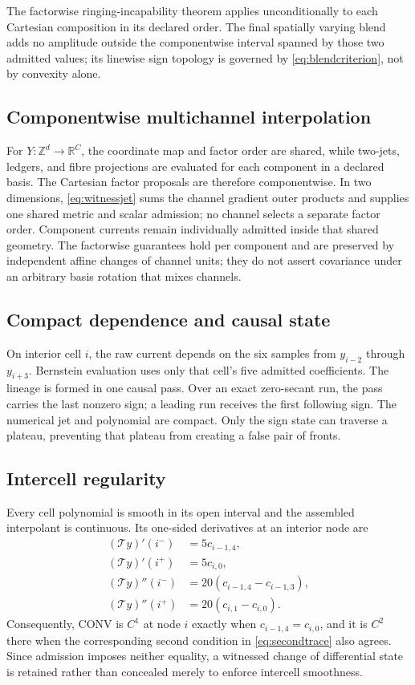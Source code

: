 \documentclass[journal]{IEEEtran}
\newcommand{\R}{\mathbb{R}}
\newcommand{\Tcal}{\mathcal{T}}
\begin{document}
The factorwise ringing-incapability theorem applies unconditionally to each
Cartesian composition in its declared order. The final spatially varying
blend adds no amplitude outside the componentwise interval spanned by those
two admitted values; its linewise sign topology is governed by
\eqref{eq:blendcriterion}, not by convexity alone.

\subsection{Componentwise multichannel interpolation}

For \(Y:\mathbb Z^d\rightarrow\R^C\), the coordinate map and factor order are
shared, while two-jets, ledgers, and fibre projections are evaluated for each
component in a declared basis. The Cartesian factor proposals are therefore
componentwise. In two dimensions, \eqref{eq:witnessjet} sums the channel
gradient outer products and supplies one shared metric and scalar admission;
no channel selects a separate factor order. Component currents remain
individually admitted inside that shared geometry. The factorwise guarantees
hold per component and are preserved by independent affine changes of channel
units; they do not assert covariance under an arbitrary basis rotation that
mixes channels.

\subsection{Compact dependence and causal state}

On interior cell \(i\), the raw current depends on the six samples from
\(y_{i-2}\) through \(y_{i+3}\). Bernstein evaluation uses only that cell's
five admitted coefficients. The lineage is formed in one causal pass. Over
an exact zero-secant run, the pass carries the last nonzero sign; a leading
run receives the first following sign. The numerical jet and polynomial are
compact. Only the sign state can traverse a plateau, preventing that plateau
from creating a false pair of fronts.

\subsection{Intercell regularity}

Every cell polynomial is smooth in its open interval and the assembled
interpolant is continuous. Its one-sided derivatives at an interior node are
\begin{align}
 (\Tcal y)'(i^-)&=5c_{i-1,4},\nonumber\\
 (\Tcal y)'(i^+)&=5c_{i,0},\label{eq:firsttrace}\\
 (\Tcal y)''(i^-)&=20(c_{i-1,4}-c_{i-1,3}),\nonumber\\
 (\Tcal y)''(i^+)&=20(c_{i,1}-c_{i,0}).
 \label{eq:secondtrace}
\end{align}
Consequently, CONV is \(C^1\) at node \(i\) exactly when
\(c_{i-1,4}=c_{i,0}\), and it is \(C^2\) there when the corresponding
second condition in \eqref{eq:secondtrace} also agrees. Since admission
imposes neither equality, a witnessed change of differential state is
retained rather than concealed merely to enforce intercell smoothness.
\end{document}
